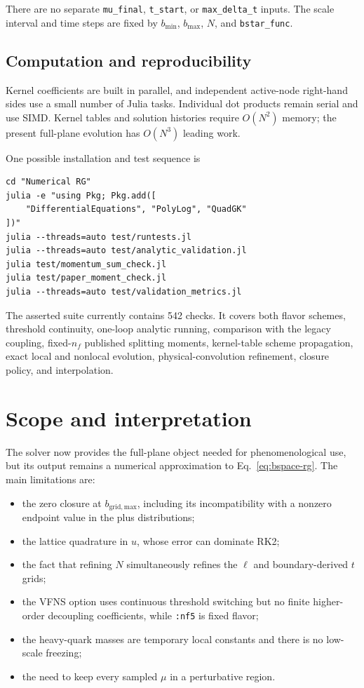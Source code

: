 \documentclass[11pt]{article}
\begin{document}
There are no separate \texttt{mu\_final}, \texttt{t\_start}, or
\texttt{max\_delta\_t} inputs. The scale interval and time steps are fixed by
\(b_{\min}\), \(b_{\max}\), \(N\), and \texttt{bstar\_func}.

\subsection{Computation and reproducibility}

Kernel coefficients are built in parallel, and independent active-node
right-hand sides use a small number of Julia tasks. Individual dot products
remain serial and use SIMD. Kernel tables and solution histories require
\(O(N^2)\) memory; the present full-plane evolution has \(O(N^3)\) leading
work.

One possible installation and test sequence is
\begin{lstlisting}
cd "Numerical RG"
julia -e "using Pkg; Pkg.add([
    "DifferentialEquations", "PolyLog", "QuadGK"
])"
julia --threads=auto test/runtests.jl
julia --threads=auto test/analytic_validation.jl
julia test/momentum_sum_check.jl
julia test/paper_moment_check.jl
julia --threads=auto test/validation_metrics.jl
\end{lstlisting}
The asserted suite currently contains 542 checks. It covers both flavor
schemes, threshold continuity, one-loop analytic running, comparison with the
legacy coupling, fixed-\(n_f\) published splitting moments, kernel-table
scheme propagation, exact local and nonlocal evolution, physical-convolution
refinement, closure policy, and interpolation.

\section{Scope and interpretation}

The solver now provides the full-plane object needed for phenomenological
use, but its output remains a numerical approximation to
Eq.~\eqref{eq:bspace-rg}. The main limitations are:
\begin{itemize}[leftmargin=1.5em]
  \item the zero closure at \(b_{\mathrm{grid,max}}\), including its
  incompatibility with a nonzero endpoint value in the plus distributions;
  \item the lattice quadrature in \(u\), whose error can dominate RK2;
  \item the fact that refining \(N\) simultaneously refines the \(\ell\) and
  boundary-derived \(t\) grids;
  \item the VFNS option uses continuous threshold switching but no finite
  higher-order decoupling coefficients, while \texttt{:nf5} is fixed flavor;
  \item the heavy-quark masses are temporary local constants and there is no
  low-scale freezing;
  \item the need to keep every sampled \(\mu\) in a perturbative region.
\end{itemize}
\end{document}
